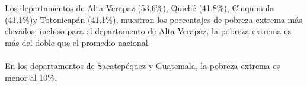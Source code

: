 Los departamentos de Alta Verapaz (53.6\%), Quiché (41.8\%), Chiquimula (41.1\%)y Totonicapán (41.1\%), muestran los porcentajes de pobreza extrema más elevados;  incluso para el departamento de Alta Verapaz, la pobreza extrema es más del doble que el promedio nacional.  \\\\ 
En los departamentos de Sacatepéquez y Guatemala, la pobreza extrema es menor al 10\%.